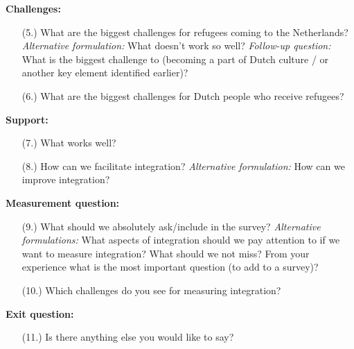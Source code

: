 \documentclass[man, 12pt, a4paper]{apa7}
\begin{document}
{\textbf{Challenges:}
\begin{enumerate}[noitemsep,topsep=0pt]
    \item [(5.)] What are the biggest challenges for refugees coming to the Netherlands?\newline
    \textit{Alternative formulation:} What doesn't work so well?\newline
    \textit{Follow-up question:} What is the biggest challenge to (becoming a part of Dutch culture / or another key element identified earlier)?
    \item [(6.)] What are the biggest challenges for Dutch people who receive refugees?
\end{enumerate}

\textbf{Support:}
\begin{enumerate}[noitemsep,topsep=0pt]
    \item [(7.)] What works well?
    \item [(8.)] How can we facilitate integration?\newline
    \textit{Alternative formulation:} How can we improve integration?
\end{enumerate}

\textbf{Measurement question:}
\begin{enumerate}[noitemsep,topsep=0pt]
    \item [(9.)] What should we absolutely ask/include in the survey?\newline
    \textit{Alternative formulations:} What aspects of integration should we pay attention to if we want to measure integration? What should we not miss? From your experience what is the most important question (to add to a survey)?
    \item [(10.)] Which challenges do you see for measuring integration?
\end{enumerate}

\textbf{Exit question:} 
\begin{enumerate}[noitemsep,topsep=0pt]
    \item [(11.)] Is there anything else you would like to say?
\end{enumerate}

}
\end{document}
